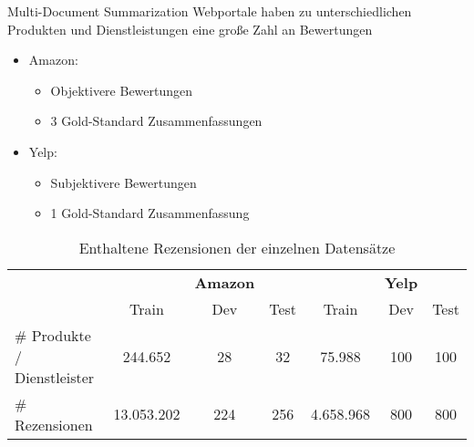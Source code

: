 \begin{frame}{Multi-Document Summarization}
  Webportale haben zu unterschiedlichen Produkten und Dienstleistungen eine große Zahl an Bewertungen
  \begin{itemize}   
      \item Amazon: \begin{itemize}
        \item Objektivere Bewertungen
        \item 3 Gold-Standard Zusammenfassungen
      \end{itemize}
      \item Yelp: \begin{itemize}
        \item Subjektivere Bewertungen
        \item 1 Gold-Standard Zusammenfassung
      \end{itemize}
  \end{itemize}

  \begin{table}[!h]
    \centering
    \begin{tabular}{@{}lccc|ccc@{}}
        \toprule
                              &            & \textbf{Amazon} &      &           & \textbf{Yelp} &      \\
                              & Train      & Dev             & Test & Train     & Dev           & Test \\ \midrule
    \# Produkte / Dienstleister & 244.652    &   28            &  32  & 75.988    &  100          &  100    \\
    \# Rezensionen            & 13.053.202 &    224          &   256& 4.658.968 &  800          &  800 \\ \bottomrule
    \end{tabular}
    \caption{Enthaltene Rezensionen der einzelnen Datensätze}

    \end{table}
\end{frame}


